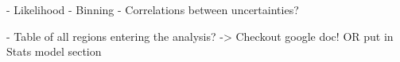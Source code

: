 - Likelihood
- Binning
- Correlations between uncertainties?

- Table of all regions entering the analysis? -> Checkout google doc! OR put in Stats model section
